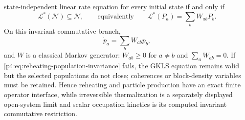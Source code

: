 \documentclass[12pt,a4paper]{article}
\begin{document}
\begin{theorem}
state-independent linear rate equation for every initial state if and only if
\begin{equation}
\label{p4:eq:reheating-population-invariance}
\mathcal L^*(\mathcal N)\subseteq\mathcal N,
\qquad\text{equivalently}\qquad
\mathcal L^*(P_a)=\sum_b W_{ab}P_b .
\end{equation}
On this invariant commutative branch,
\[
\dot p_a=\sum_bW_{ab}p_b,
\]
and \(W\) is a classical Markov generator: \(W_{ab}\ge0\) for
\(a\ne b\) and \(\sum_aW_{ab}=0\).  If
\eqref{p4:eq:reheating-population-invariance} fails, the GKLS equation remains
valid but the selected populations do not close; coherences or block-density
variables must be retained.
Hence reheating and particle production have an exact finite operator
interface, while irreversible thermalization is a separately displayed
open-system limit and scalar occupation kinetics is its computed invariant
commutative restriction.
\end{theorem}
\end{document}
